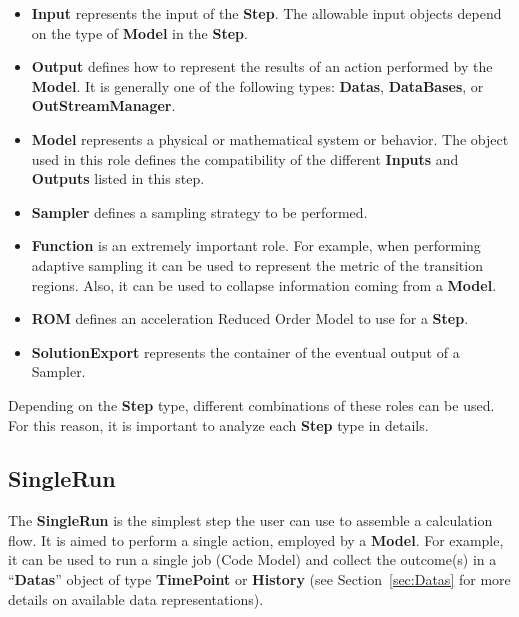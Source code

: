 \begin{itemize}
\item \textbf{Input} represents the input of the \textbf{Step}.
The allowable input objects depend on the type of \textbf{Model} in the
\textbf{Step}.
\item \textbf{Output} defines how to represent the results of an action
performed by the \textbf{Model}.
It is generally one of the following types: \textbf{Datas}, \textbf{DataBases}, 
or \textbf{OutStreamManager}.
\item \textbf{Model} represents a physical or mathematical system or behavior.
The object used in this role defines the compatibility of the different
\textbf{Inputs} and \textbf{Outputs} listed in this step.
\item \textbf{Sampler} defines a sampling strategy to be performed.
\item \textbf{Function} is an extremely important role.
For example, when performing adaptive sampling it can be used to represent the
metric of the transition regions.
Also, it can be used to collapse information coming from a \textbf{Model}.
\item \textbf{ROM} defines an acceleration Reduced Order Model to use for a 
\textbf{Step}.
\item \textbf{SolutionExport} represents the container of the eventual output
of a Sampler.
\end{itemize}
Depending on the \textbf{Step} type, different combinations of these roles can
be used.
For this reason, it is important to analyze each \textbf{Step} type in details.

\subsection{SingleRun}
\label{subsec:stepSingleRun}
The \textbf{SingleRun} is the simplest step the user can use to assemble a
calculation flow.
%
It is aimed to perform a single action, employed by a \textbf{Model}.
%
For example, it can be used to run a single job (Code Model) and collect the
outcome(s) in a ``\textbf{Datas}'' object of type \textbf{TimePoint} or 
\textbf{History} (see Section~\ref{sec:Datas} for more details on available data
representations).

